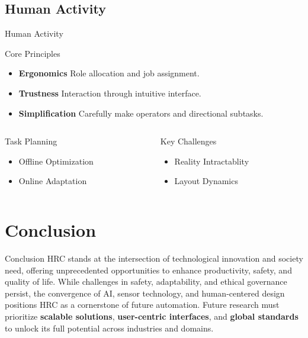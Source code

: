\documentclass{beamer}
\begin{document}
\subsection{Human Activity}
\begin{frame}{Human Activity}

\begin{block}{Core Principles}
\begin{itemize}
\item \textbf{Ergonomics} Role allocation and job assignment.
\item \textbf{Trustness}  Interaction through intuitive interface.
\item \textbf{Simplification} Carefully make operators and directional subtasks.
\end{itemize}
\end{block}

\vspace{3mm}

\begin{columns}
\begin{column}{0.45\textwidth}
\begin{block}{Task Planning}
\begin{itemize}
\item Offline Optimization
\item Online Adaptation
\end{itemize}
\end{block}
\end{column}

\begin{column}{0.45\textwidth}
\begin{block}{Key Challenges}
\begin{itemize}
\item Reality Intractablity
\item Layout Dynamics
\end{itemize}
\end{block}
\end{column}
\end{columns}

\end{frame}

\section{Conclusion}
\begin{frame}{Conclusion}
\justifying
HRC stands at the intersection of technological innovation and society need, offering unprecedented opportunities to enhance productivity, safety, and quality of life. While challenges in safety, adaptability, and ethical governance persist, the convergence of AI, sensor technology, and human-centered design positions HRC as a cornerstone of future automation. Future research must prioritize \textbf{scalable solutions}, \textbf{user-centric interfaces}, and \textbf{global standards} to unlock its full potential across industries and domains.
\end{frame}
\end{document}

